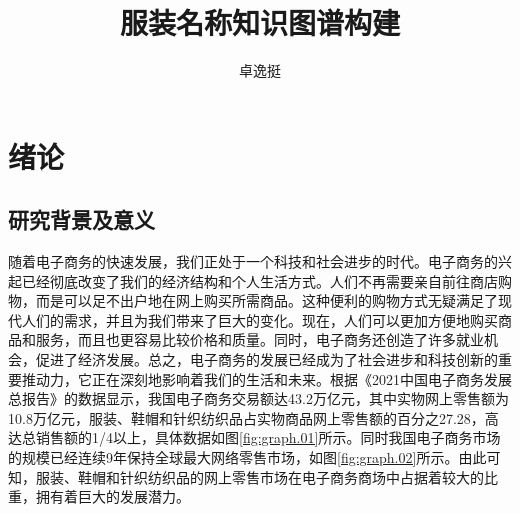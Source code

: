 \documentclass[bachelor_p]{hdu-thesis}
\title{服装名称知识图谱构建}{Munual of latex on thesis for HDU}
\author{卓逸挺}{San Zhang}%
\begin{document}
\makecover
\makedeclaration











\tableofcontents


\chapter{绪论}
\section{研究背景及意义}

随着电子商务的快速发展，我们正处于一个科技和社会进步的时代。电子商务的兴起已经彻底改变了我们的经济结构和个人生活方式。人们不再需要亲自前往商店购物，而是可以足不出户地在网上购买所需商品。这种便利的购物方式无疑满足了现代人们的需求，并且为我们带来了巨大的变化。现在，人们可以更加方便地购买商品和服务，而且也更容易比较价格和质量。同时，电子商务还创造了许多就业机会，促进了经济发展。总之，电子商务的发展已经成为了社会进步和科技创新的重要推动力，它正在深刻地影响着我们的生活和未来。根据《2021中国电子商务发展总报告》\cite{book1}的数据显示，我国电子商务交易额达43.2万亿元，其中实物网上零售额为10.8万亿元，服装、鞋帽和针织纺织品占实物商品网上零售额的百分之27.28，高达总销售额的1/4以上，具体数据如图\ref{fig:graph.01}所示。同时我国电子商务市场的规模已经连续9年保持全球最大网络零售市场\cite{book2}，如图\ref{fig:graph.02}所示。由此可知，服装、鞋帽和针织纺织品的网上零售市场在电子商务商场中占据着较大的比重，拥有着巨大的发展潜力。
\end{document}
